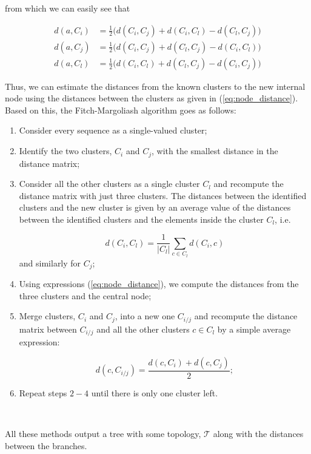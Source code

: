 from which we can easily see that 

\begin{eqnarray}
d(a, C_i) &= \frac{1}{2}\bigg(d(C_i, C_j) + d(C_i, C_l) - d(C_l, C_j)\bigg)\nonumber \\
d(a, C_j) &= \frac{1}{2}\bigg(d(C_i, C_j) + d(C_l, C_j) - d(C_i, C_l)\bigg)\label{eq:node_distance}\\
d(a, C_l) &= \frac{1}{2}\bigg(d(C_i, C_l) + d(C_l, C_j) - d(C_i, C_j)\bigg)\nonumber 
\end{eqnarray}

Thus, we can estimate the distances from the known clusters to the new internal node using the distances between the clusters as given in (\ref{eq:node_distance}). Based on this, the Fitch-Margoliash algorithm goes as follows:

\begin{enumerate}
    \item Consider every sequence as a single-valued cluster;
    \item Identify the two clusters, $C_i$ and $C_j$, with the smallest distance in the distance matrix;
    \item Consider all the other clusters as a single cluster $C_l$ and recompute the distance matrix with just three clusters. The distances between the identified clusters and the new cluster is given by an average value of the distances between the identified clusters and the elements inside the cluster $C_l$, i.e.
    
    $$d(C_i, C_l) = \frac{1}{|C_l|} \sum_{c\in C_l} d(C_i, c)$$
    and similarly for $C_j$;
    \item Using expressions (\ref{eq:node_distance}), we compute the distances from the three clusters and the central node;
    \item  Merge clusters, $C_i$ and $C_j$, into a new one $C_{i/j}$ and recompute the distance matrix between $C_{i/j}$ and all the other clusters $c\in C_l$ by a simple average expression:
    
    $$d(c, C_{i/j}) = \frac{d(c, C_i) + d(c, C_j)}{2};$$
    
    \item Repeat steps $2-4$ until there is only one cluster left.
\end{enumerate}


\

All these methods output a tree with some topology, $\mathcal{T}$ along with the distances between the branches. 


